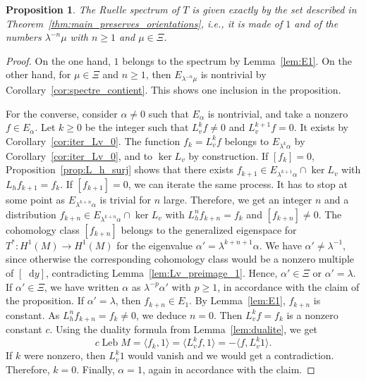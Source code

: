 \documentclass[11pt, a4paper, oneside, final, pagebackref]{amsart}
\newcommand{\dd}{\mathop{}\!\mathrm{d}}
\DeclareMathOperator{\Leb}{Leb}
\renewcommand{\geq}{\geqslant}
\newtheorem{prop}[thm]{Proposition}
\theoremstyle{definition}
\numberwithin{equation}{section}
\begin{document}
\begin{prop}
\label{prop:partiel} The Ruelle spectrum of $T$ is given exactly by the set
described in Theorem~\ref{thm:main_preserves_orientations}, i.e., it is made
of $1$ and of the numbers $\lambda^{-n} \mu$ with $n\geq 1$ and $\mu \in
\Xi$.
\end{prop}
\begin{proof}
On the one hand, $1$ belongs to the spectrum by Lemma~\ref{lem:E1}. On the
other hand, for $\mu \in \Xi$ and $n\geq 1$, then $E_{\lambda^{-n} \mu}$ is
nontrivial by Corollary~\ref{cor:spectre_contient}. This shows one inclusion
in the proposition.

For the converse, consider $\alpha\neq 0$ such that $E_\alpha$ is nontrivial,
and take a nonzero $f \in E_\alpha$. Let $k\geq 0$ be the integer such that
$L_v^k f \neq 0$ and $L_v^{k+1}f=0$. It exists by
Corollary~\ref{cor:iter_Lv_0}. The function $f_k = L_v^k f$ belongs to
$E_{\lambda^k \alpha}$ by Corollary~\ref{cor:iter_Lv_0}, and to $\ker L_v$ by
construction. If $[f_k] = 0$, Proposition~\ref{prop:L_h_surj} shows that
there exists $f_{k+1} \in E_{\lambda^{k+1}\alpha} \cap \ker L_v$ with $L_h
f_{k+1} = f_k$. If $[f_{k+1}] = 0$, we can iterate the same process. It has
to stop at some point as $E_{\lambda^{k+n} \alpha}$ is trivial for $n$ large.
Therefore, we get an integer $n$ and a distribution $f_{k+n} \in
E_{\lambda^{k+n} \alpha} \cap \ker L_v$ with $L_h^n f_{k+n} = f_k$ and
$[f_{k+n}] \neq 0$. The cohomology class $[f_{k+n}]$ belongs to the
generalized eigenspace for $T^*: H^1(M) \to H^1(M)$ for the eigenvalue
$\alpha' = \lambda^{k+n+1} \alpha$. We have $\alpha' \neq \lambda^{-1}$,
since otherwise the corresponding cohomology class would be a nonzero
multiple of $[\dd y]$, contradicting Lemma~\ref{lem:Lv_preimage_1}. Hence,
$\alpha' \in \Xi$ or $\alpha' = \lambda$. If $\alpha' \in \Xi$, we have
written $\alpha$ as $\lambda^{-p} \alpha'$ with $p\geq 1$, in accordance with
the claim of the proposition. If $\alpha' = \lambda$, then $f_{k+n} \in E_1$.
By Lemma~\ref{lem:E1}, $f_{k+n}$ is constant. As $L_h^n f_{k+n} = f_k \neq
0$, we deduce $n = 0$. Then $L_v^k f = f_k$ is a nonzero constant $c$. Using
the duality formula from Lemma~\ref{lem:dualite}, we get
\begin{equation*}
  c \Leb M = \langle f_k, 1 \rangle = \langle L_v^k f, 1 \rangle
  = - \langle f, L_v^k 1 \rangle.
\end{equation*}
If $k$ were nonzero, then $L_v^k 1$ would vanish and we would get a
contradiction. Therefore, $k=0$. Finally, $\alpha=1$, again in accordance
with the claim.
\end{proof}
\end{document}
